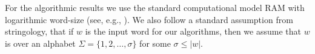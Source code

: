 \documentclass[10pt,a4paper]{amsart}
\newcommand{\N}{\mathbb{N}}
\DeclareMathOperator\ScatFact{SubSeq}
\DeclareMathOperator{\letters}{alph}
\DeclareMathOperator{\NUniv}{NUniv}
\DeclarePairedDelimiter\card{\lvert}{\rvert}
\DeclarePairedDelimiter\paren{(}{)}
\theoremstyle{plain}
\newtheorem{lemma}{Lemma}
\newtheorem{corollary}{Corollary}
\theoremstyle{definition}
\begin{document}

For the algorithmic results we use the standard 
computational model RAM with logarithmic word-size (see, e.g., \cite{KarkkainenSB06}). We also 
follow a standard assumption from stringology, that if $w$ is the 
input word for our algorithms, then we assume that $w$ is over an alphabet $\Sigma=\{ 1,2, \ldots, \sigma\}$ for some $\sigma\leq |w|$.


	
	
	
	
\end{document}
